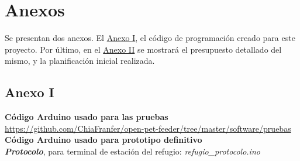 \documentclass[12pt]{article}
\begin{document}
	\pagebreak
	
	\section*{Anexos}
	
	\noindent Se presentan dos anexos. El \hyperref[anexo I: codigo]{Anexo I}, el código de programación creado para este proyecto. Por último, en el \hyperref[anexo II: presupuesto]{Anexo II} se mostrará el presupuesto detallado del mismo, y la planificación inicial realizada. \\
	
	\pagebreak
	
	\subsection*{Anexo I}
	\label{anexo I: codigo}
	
	\noindent \textbf{Código Arduino usado para las pruebas}\\
	
	\noindent \small \url{https://github.com/ChiaFranfer/open-pet-feeder/tree/master/software/pruebas}\\

	\noindent \textbf{Código Arduino usado para prototipo definitivo} \\
	
	\noindent \textit{\textbf{Protocolo}}, para terminal de estación del refugio: \textit{refugio\_protocolo.ino} \\
	
\end{document}
